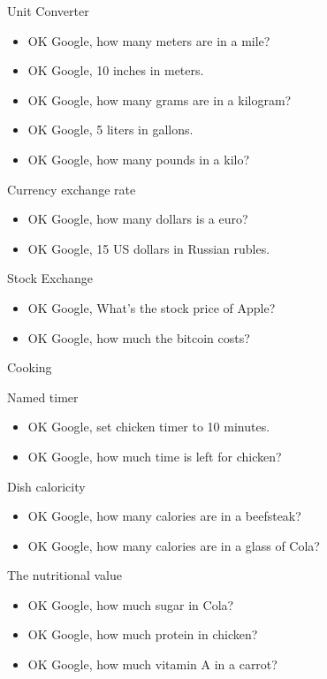 \documentclass[
  letterpaper,
  DIV=11,
  numbers=noendperiod]{scrartcl}
\providecommand{\tightlist}{%
  \setlength{\itemsep}{0pt}\setlength{\parskip}{0pt}}\usepackage{longtable,booktabs,array}
\begin{document}
Unit Converter

\begin{itemize}
\tightlist
\item
  OK Google, how many meters are in a mile?
\item
  OK Google, 10 inches in meters.
\item
  OK Google, how many grams are in a kilogram?
\item
  OK Google, 5 liters in gallons.
\item
  OK Google, how many pounds in a kilo?
\end{itemize}

Currency exchange rate

\begin{itemize}
\tightlist
\item
  OK Google, how many dollars is a euro?
\item
  OK Google, 15 US dollars in Russian rubles.
\end{itemize}

Stock Exchange

\begin{itemize}
\tightlist
\item
  OK Google, What's the stock price of Apple?
\item
  OK Google, how much the bitcoin costs?
\end{itemize}

Cooking

Named timer

\begin{itemize}
\tightlist
\item
  OK Google, set chicken timer to 10 minutes.
\item
  OK Google, how much time is left for chicken?
\end{itemize}

Dish caloricity

\begin{itemize}
\tightlist
\item
  OK Google, how many calories are in a beefsteak?
\item
  OK Google, how many calories are in a glass of Cola?
\end{itemize}

The nutritional value

\begin{itemize}
\tightlist
\item
  OK Google, how much sugar in Cola?
\item
  OK Google, how much protein in chicken?
\item
  OK Google, how much vitamin A in a carrot?
\end{itemize}
\end{document}
